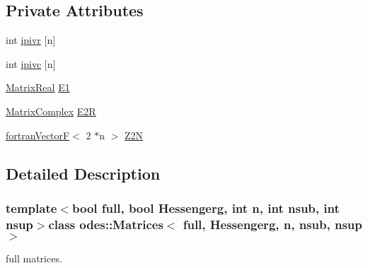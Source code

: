 \subsection*{Private Attributes}
\begin{DoxyCompactItemize}
\item 
int \hyperlink{classodes_1_1Matrices_ac7c747721a0d2ca7f9b792f25ce07ea9}{ipivr} \mbox{[}n\mbox{]}
\item 
int \hyperlink{classodes_1_1Matrices_a32b17a76a3380307a8fe5e6aa1395e4a}{ipivc} \mbox{[}n\mbox{]}
\item 
\hyperlink{classodes_1_1Matrices_aa028f1e52916558a51d333ac8b081030}{Matrix\-Real} \hyperlink{classodes_1_1Matrices_afba5034652d2298f7f8ad01468a1bdbd}{E1}
\item 
\hyperlink{classodes_1_1Matrices_aa1313b5ab7fdab6f5320c8d5aa3bfc24}{Matrix\-Complex} \hyperlink{classodes_1_1Matrices_a62ad6fe606146f2957ff8d428da1867d}{E2\-R}
\item 
\hyperlink{classodes_1_1fortranVectorF}{fortran\-Vector\-F}$<$ 2 $\ast$n $>$ \hyperlink{classodes_1_1Matrices_a812f56a1f3582a4c25271306644606f0}{Z2\-N}
\end{DoxyCompactItemize}


\subsection{Detailed Description}
\subsubsection*{template$<$bool full, bool Hessengerg, int n, int nsub, int nsup$>$class odes\-::\-Matrices$<$ full, Hessengerg, n, nsub, nsup $>$}

full matrices. 

